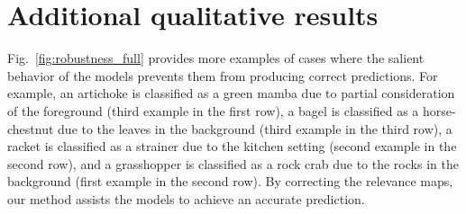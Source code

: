 \documentclass{article}
\begin{document}
\section{Additional qualitative results}
\label{sec:qualitative}
Fig.~\ref{fig:robustness_full} provides more examples of cases where the salient behavior of the models prevents them from producing correct predictions. For example, an artichoke is classified as a green mamba due to partial consideration of the foreground (third example in the first row), a bagel is classified as a horse-chestnut due to the leaves in the background (third example in the third row), a racket is classified as a strainer due to the kitchen setting (second example in the second row), and a grasshopper is classified as a rock crab due to the rocks in the background (first example in the second row). By correcting the relevance maps, our method assists the models to achieve an accurate prediction.
\end{document}
